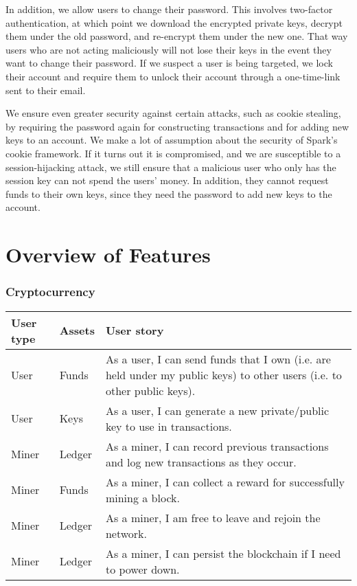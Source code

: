 \documentclass[12pt]{article}
\begin{document}
In addition, we allow users to change their password. This involves two-factor authentication, at which point we download the encrypted private keys, decrypt them under the old password, and re-encrypt them under the new one. That way users who are not acting maliciously will not lose their keys in the event they want to change their password. If we suspect a user is being targeted, we lock their account and require them to unlock their account through a one-time-link sent to their email.

We ensure even greater security against certain attacks, such as cookie stealing, by requiring the password again for constructing transactions and for adding new keys to an account. We make a lot of assumption about the security of Spark's cookie framework. If it turns out it is compromised, and we are susceptible to a session-hijacking attack, we still ensure that a malicious user who only has the session key can not spend the users' money. In addition, they cannot request funds to their own keys, since they need the password to add new keys to the account.

\section{Overview of Features}

\subsubsection*{Cryptocurrency}

\begin{tabularx}{\linewidth}{|l|l|X|}
\hline
\textbf{User type} & \textbf{Assets} & \textbf{User story} \\
\hline
User & Funds & As a user, I can send funds that I own (i.e. are held under my public keys) to other users (i.e. to other public keys). \\
\hline
User & Keys & As a user, I can generate a new private/public key to use in transactions. \\
\hline
Miner & Ledger & As a miner, I can record previous transactions and log new transactions as they occur. \\
\hline
Miner & Funds & As a miner, I can collect a reward for successfully mining a block. \\
\hline
Miner & Ledger & As a miner, I am free to leave and rejoin the network. \\
\hline
Miner & Ledger & As a miner, I can persist the blockchain if I need to power down. \\
\hline
\end{tabularx}
\end{document}
